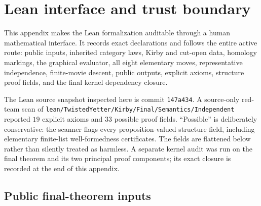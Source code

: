 \section{Lean interface and trust boundary}
\label{app:lean-interface}

This appendix makes the Lean formalization auditable through a human
mathematical interface.  It records exact declarations and follows the entire
active route: public inputs, inherited category laws, Kirby and cut-open data,
homology markings, the graphical evaluator, all eight elementary moves,
representative independence, finite-movie descent, public outputs, explicit
axioms, structure proof fields, and the final kernel dependency closure.

The Lean source snapshot inspected here is commit \texttt{147a434}.  A
source-only red-team scan of
\nolinkurl{lean/TwistedYetter/Kirby/Final/Semantics/Independent}
reported $19$ explicit axioms and $33$ possible proof fields.  ``Possible'' is
deliberately conservative: the scanner flags every proposition-valued
structure field, including elementary finite-list well-formedness certificates.
The fields are flattened below rather than silently treated as harmless.  A
separate kernel audit was run on the final theorem and its two principal proof
components; its exact closure is recorded at the end of this appendix.

\subsection{Public final-theorem inputs}
\label{app:lean-public-inputs}

